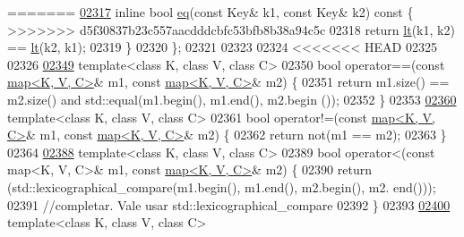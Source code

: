 \begin{DoxyCode}
=======
\hyperlink{classaed2_1_1map_aebf6c09c424c39a874798165401b309e_aebf6c09c424c39a874798165401b309e}{02317}     \textcolor{keyword}{inline} \textcolor{keywordtype}{bool} \hyperlink{classaed2_1_1map_aebf6c09c424c39a874798165401b309e_aebf6c09c424c39a874798165401b309e}{eq}(\textcolor{keyword}{const} Key& k1, \textcolor{keyword}{const} Key& k2)\textcolor{keyword}{ const }\{
>>>>>>> d5f30837b23c557aacdddcbfc53bfb8b38a94c5c
02318         \textcolor{keywordflow}{return} \hyperlink{classaed2_1_1map_a0e5be36fae0693e4665bd2a615e7550a_a0e5be36fae0693e4665bd2a615e7550a}{lt}(k1, k2) == \hyperlink{classaed2_1_1map_a0e5be36fae0693e4665bd2a615e7550a_a0e5be36fae0693e4665bd2a615e7550a}{lt}(k2, k1);
02319     \}
02320 \};
02321 
02323 
02324 
<<<<<<< HEAD
02325 
02326 
\hypertarget{map3_8h_source_l02349}{}\hyperlink{classaed2_1_1map_abfc51b39670220e79037ac067006e933_abfc51b39670220e79037ac067006e933}{02349} \textcolor{keyword}{template}<\textcolor{keyword}{class} K, \textcolor{keyword}{class} V, \textcolor{keyword}{class} C>
02350 \textcolor{keywordtype}{bool} operator==(\textcolor{keyword}{const} \hyperlink{classaed2_1_1map}{map<K, V, C>}& m1, \textcolor{keyword}{const} \hyperlink{classaed2_1_1map}{map<K, V, C>}& m2) \{
02351     \textcolor{keywordflow}{return} m1.size() == m2.size() and std::equal(m1.begin(), m1.end(), m2.begin
      ());
02352 \}
02353 
\hypertarget{map3_8h_source_l02360}{}\hyperlink{classaed2_1_1map_abce0fa35c5b25fd67111c2e704616f09_abce0fa35c5b25fd67111c2e704616f09}{02360} \textcolor{keyword}{template}<\textcolor{keyword}{class} K, \textcolor{keyword}{class} V, \textcolor{keyword}{class} C>
02361 \textcolor{keywordtype}{bool} operator!=(\textcolor{keyword}{const} \hyperlink{classaed2_1_1map}{map<K, V, C>}& m1, \textcolor{keyword}{const} \hyperlink{classaed2_1_1map}{map<K, V, C>}& m2) \{
02362     \textcolor{keywordflow}{return} not(m1 == m2);
02363 \}
02364 
\hypertarget{map3_8h_source_l02388}{}\hyperlink{classaed2_1_1map_a8ff07f6a24c290ea7e8f63ec7ab24f8d_a8ff07f6a24c290ea7e8f63ec7ab24f8d}{02388} \textcolor{keyword}{template}<\textcolor{keyword}{class} K, \textcolor{keyword}{class} V, \textcolor{keyword}{class} C>
02389 \textcolor{keywordtype}{bool} operator<(const map<K, V, C>& m1, \textcolor{keyword}{const} \hyperlink{classaed2_1_1map}{map<K, V, C>}& m2) \{
02390     \textcolor{keywordflow}{return} (std::lexicographical\_compare(m1.begin(), m1.end(), m2.begin(), m2.
      end()));
02391     \textcolor{comment}{//completar.  Vale usar std::lexicographical\_compare}
02392 \}
02393 
\hypertarget{map3_8h_source_l02400}{}\hyperlink{classaed2_1_1map_a2000cd874b72034ce7fe730c811b6c63_a2000cd874b72034ce7fe730c811b6c63}{02400} \textcolor{keyword}{template}<\textcolor{keyword}{class} K, \textcolor{keyword}{class} V, \textcolor{keyword}{class} C>

\end{DoxyCode}
